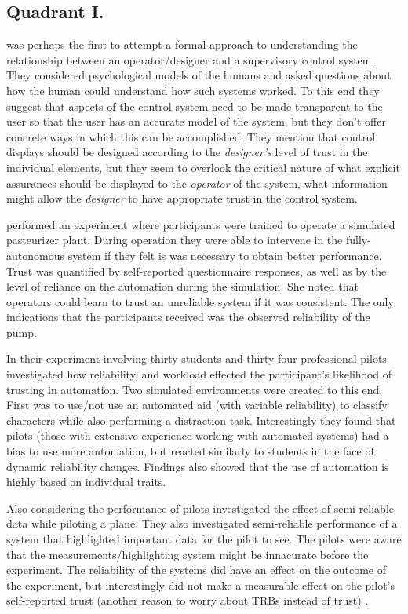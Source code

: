 \subsection{Quadrant I.}\label{sec:q1}
\citet{Sheridan1984-kx} was perhaps the first to attempt a formal approach to understanding the relationship between an operator/designer and a supervisory control system. They considered psychological models of the humans and asked questions about how the human could understand how such systems worked. To this end they suggest that aspects of the control system need to be made transparent to the user so that the user has an accurate model of the system, but they don't offer concrete ways in which this can be accomplished. They mention that control displays should be designed according to the \emph{designer's} level of trust in the individual elements, but they seem to overlook the critical nature of what explicit assurances should be displayed to the \emph{operator} of the system,  what information might allow the \emph{designer} to have appropriate trust in the control system.

\citet{Muir1996-gt} performed an experiment where participants were trained to operate a simulated pasteurizer plant. During operation they were able to intervene in the fully-autonomous system if they felt is was necessary to obtain better performance. Trust was quantified by self-reported questionnaire responses, as well as by the level of reliance on the automation during the simulation. She noted that operators could learn to trust an unreliable system if it was consistent. The only indications that the participants received was the observed reliability of the pump. 

In their experiment involving thirty students and thirty-four professional pilots \citet{Riley1996-qm} investigated how reliability, and workload effected the participant's likelihood of trusting in automation. Two simulated environments were created to this end. First was to use/not use an automated aid (with variable reliability) to classify characters while also performing a distraction task. Interestingly they found that pilots (those with extensive experience working with automated systems) had a bias to use more automation, but reacted similarly to students in the face of dynamic reliability changes. Findings also showed that the use of automation is highly based on individual traits.

Also considering the performance of pilots \citet{Wickens1999-la} investigated the effect of semi-reliable data while piloting a plane. They also investigated semi-reliable performance of a system that highlighted important data for the pilot to see. The pilots were aware that the measurements/highlighting system might be innacurate before the experiment. The reliability of the systems did have an effect on the outcome of the experiment, but interestingly did not make a measurable effect on the pilot's self-reported trust (another reason to worry about TRBs instead of trust) .

